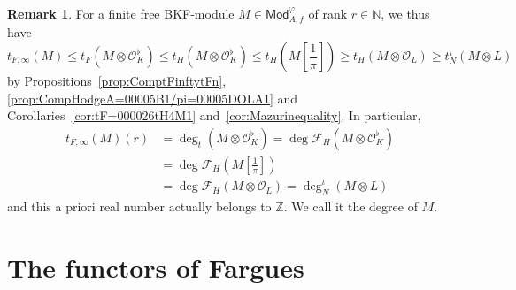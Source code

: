 \documentclass[11pt]{article}
\theoremstyle{definition}
\newtheorem{rema}[theo]{Remark}
\numberwithin{equation}{section}
\numberwithin{figure}{section}
\numberwithin{table}{section}
\newcommand{\Mod}{\mathsf{Mod}}
\begin{document}
\begin{rema}
For a finite free BKF-module $M\in\Mod_{A,f}^{\varphi}$ of rank $r\in\mathbb{N}$, we thus have
\[
t_{F,\infty}(M)\leq t_{F}(M\otimes\mathcal{O}_{K}^{\flat})\leq t_{H}(M\otimes\mathcal{O}_{K}^{\flat})\leq t_{H}\!\left(M\!\left[{\frac{1}{\pi}}\right]\right)\geq t_{H}(M\otimes\mathcal{O}_{L})\geq t_{N}^{\iota}(M\otimes L)
\]
by Propositions~\ref{prop:ComptFinftytFn}, \ref{prop:CompHodgeA=00005B1/pi=00005DOLA1} and Corollaries~\ref{cor:tF=000026tH4M1} and~\ref{cor:Mazurinequality}. In particular,
\[
\begin{aligned}t_{F,\infty}(M)(r) & =\deg_{t}(M\otimes\mathcal{O}_{K}^{\flat})=\deg\mathcal{F}_{H}(M\otimes\mathcal{O}_{K}^{\flat})\\
& =\deg\mathcal{F}_{H}\!\left(M\!\left[\frac{1}{\pi}\right]\right)\\
& =\deg\mathcal{F}_{H}(M\otimes\mathcal{O}_{L})=\deg_{N}^{\iota}(M\otimes L)
\end{aligned}
\]
and this a priori real number actually belongs to $\mathbb{Z}$. We call it the degree of $M$.
\end{rema}


\section{The functors of Fargues}\label{sec:FunctorsOfFargues}
\end{document}
